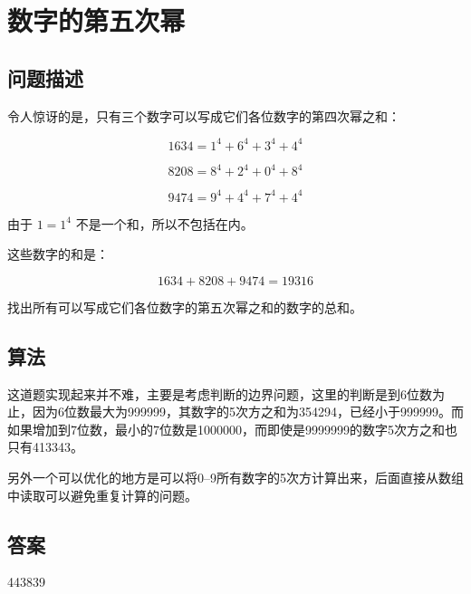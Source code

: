 \section{数字的第五次幂}\label{sec:problem30}
\subsection{问题描述}
\begin{tcolorbox}

令人惊讶的是，只有三个数字可以写成它们各位数字的第四次幂之和：

\[
1634 = 1^4 + 6^4 + 3^4 + 4^4
\]

\[
8208 = 8^4 + 2^4 + 0^4 + 8^4
\]

\[
9474 = 9^4 + 4^4 + 7^4 + 4^4
\]

由于 $1 = 1^4$ 不是一个和，所以不包括在内。

这些数字的和是：

\[
1634 + 8208 + 9474 = 19316
\]

找出所有可以写成它们各位数字的第五次幂之和的数字的总和。
\end{tcolorbox}

\subsection{算法}
这道题实现起来并不难，主要是考虑判断的边界问题，这里的判断是到6位数为止，因为6位数最大为\num{999999}，其数字的5次方之和为\num{354294}，已经小于\num{999999}。而如果增加到7位数，最小的7位数是\num{1000000}，而即使是\num{9999999}的数字5次方之和也只有\num{413343}。

另外一个可以优化的地方是可以将0--9所有数字的5次方计算出来，后面直接从数组中读取可以避免重复计算的问题。

\subsection{答案}
443839
